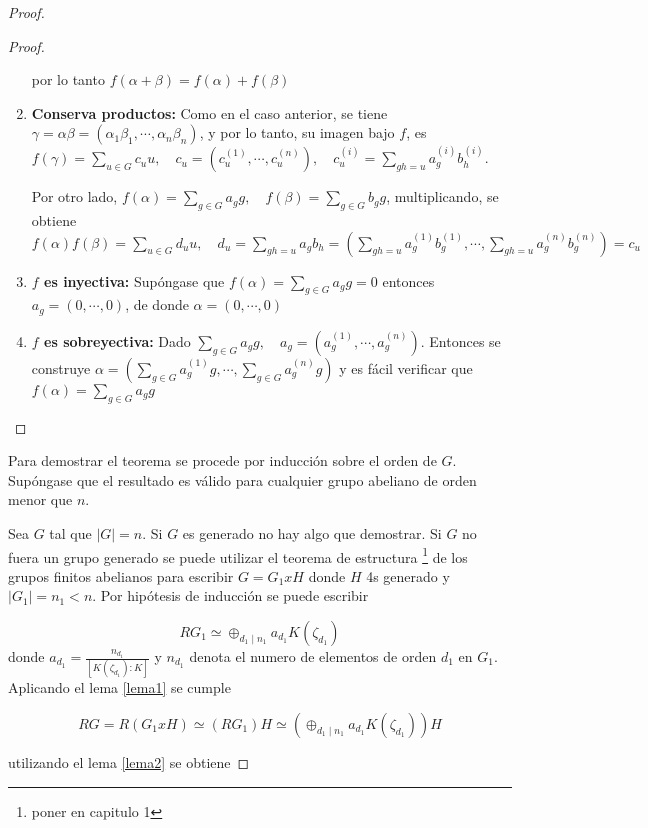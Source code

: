 \begin{proof}
\begin{proof}
\begin{enumerate}
por lo tanto $f(\alpha + \beta) = f(\alpha) + f(\beta)$

\item \textbf{Conserva productos:} Como en el caso anterior, se tiene $\gamma = \alpha\beta = (\alpha_1\beta_1, \cdots, \alpha_n\beta_n)$, y por lo tanto, su imagen bajo $f$, es $f(\gamma) = \sum_{u \in G}c_uu, \quad c_u = (c_u^{(1)}, \cdots, c_u^{(n)}), \quad c_u^{(i)} = \sum_{gh=u}a_g^{(i)}b_h^{(i)}$.

Por otro lado, $f(\alpha) = \sum_{g \in G}a_gg, \quad f(\beta) = \sum_{g \in G}b_gg$, multiplicando, se obtiene $f(\alpha)f(\beta) = \sum_{u \in G}d_uu, \quad d_u = \sum_{gh = u }a_gb_h = \left( \sum_{gh=u}a_g^{(1)}b_g^{(1)}, \cdots, \sum_{gh=u}a_g^{(n)}b_g^{(n) } \right) = c_u$

\item \textbf{$f$ es inyectiva:} Supóngase que $f(\alpha) = \sum_{g\in G}a_gg = 0$ entonces $a_g = (0, \cdots, 0)$, de donde $\alpha = (0, \cdots, 0)$ 

\item \textbf{$f$ es sobreyectiva: } Dado $\sum_{g \in G}a_gg, \quad a_g = (a_g^{(1)}, \cdots, a_g^{(n)})$. Entonces se construye $\alpha = \left( \sum_{g\in G}a_g^{(1)}g, \cdots, \sum_{g\in G}a_g^{(n)}g  \right)$ y es fácil verificar que $f(\alpha) = \sum_{g \in G}a_gg$ \qedhere
\end{enumerate}
\end{proof}



Para demostrar el teorema se procede por inducción sobre el orden de $G$. Supóngase que el resultado es válido para cualquier grupo abeliano de orden menor que $n$. 

Sea $G$ tal que $|G| = n$. Si $G$ es generado no hay algo que demostrar. Si $G$ no fuera un grupo generado se puede utilizar el teorema de estructura \footnote{poner en capitulo 1} de los grupos finitos abelianos para escribir $G = G_1 x H$ donde $H$ 4s generado y $|G_1| = n_1 < n$. Por hipótesis de inducción se puede escribir 

\[ RG_1 \simeq \oplus_{d_1\mid n_1} a_{d_1}K(\zeta_{d_1})   \]
donde $a_{d_1} = \frac{n_{d_1}}{[K(\zeta_{d_1}):K]}$ y $n_{d_1}$ denota el numero de elementos de orden $d_1$ en $G_1$. Aplicando el lema \ref{lema1} se cumple

\[  RG = R(G_1 x H) \simeq (RG_1)H \simeq \left(\oplus_{d_1\mid n_1}a_{d_1}K(\zeta_{d_1})\right) H   \]

utilizando el lema \ref{lema2} se obtiene


\end{proof}
